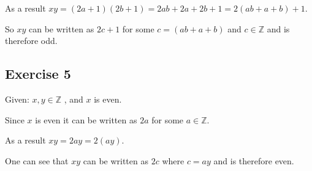 \documentclass[a4paper]{article}
\begin{document}
As a result $xy = (2a+1)(2b+1) = 2ab + 2a + 2b + 1 = 2(ab+a+b)+1$.

So $xy$ can be written as $2c+1$ for some $c=(ab+a+b)$ and $c \in \mathbb{Z}$
and is therefore odd.

\subsection{Exercise 5}

Given: $ x, y \in \mathbb{Z} $ , and $x$ is even.

Since $x$ is even it can be written as $2a$ for some $a \in \mathbb{Z}$.

As a result $xy = 2ay = 2(ay)$.

One can see that $xy$ can be written as $2c$ where $c = ay$ and is therefore
even.
\end{document}
